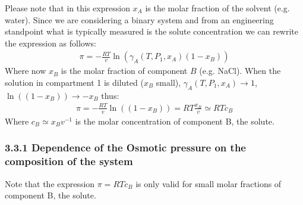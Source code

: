 \documentclass[letterpaper,10pt,english]{jupyterBook}
\begin{document}
\sphinxAtStartPar
Please note that in this expression \(x_A\) is the molar fraction of the solvent (e.g. water). Since we are considering a binary system and from an engineering standpoint what is typically measured is the solute concentration we can rewrite the expression as follows:
\begin{equation}\label{equation:Osmosis:OSMeq7}
\begin{split}
\pi=-\frac{RT}{v}\ln\left({\gamma_A(T,P_1,x_A)(1-x_B)}\right)
\end{split}
\end{equation}
\sphinxAtStartPar
Where now \(x_B\) is the molar fraction of component \(B\) (e.g. NaCl).
When the solution in compartment 1 is diluted (\(x_B\) small), \(\gamma_A(T,P_1,x_A)\rightarrow{1}\),  \(\ln{\left({(1-x_B)}\right)}\rightarrow{-x_B}\) thus:
\begin{equation}\label{equation:Osmosis:OSMeq8}
\begin{split}
\pi=-\frac{RT}{v}\ln\left({(1-x_B)}\right)={RT\frac{x_B}{v}}\simeq{RTc_B}
\end{split}
\end{equation}
\sphinxAtStartPar
Where \(c_B\simeq{x_B}v^{-1}\) is the molar concentration of component B, the solute.


\subsubsection{3.3.1 Dependence of the Osmotic pressure on the composition of the system}
\label{\detokenize{Osmosis:dependence-of-the-osmotic-pressure-on-the-composition-of-the-system}}
\sphinxAtStartPar
Note that the expression \(\pi={RTc_B}\) is only valid for small molar fractions of component B, the solute.
\end{document}

